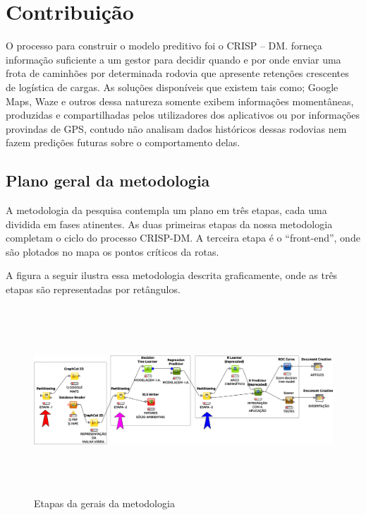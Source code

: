 \chapter{Contribuição}\label{meto}

O processo para construir o modelo preditivo foi o CRISP -- DM. forneça informação suficiente a um gestor para decidir quando e por onde 
enviar uma frota de caminhões por determinada rodovia que apresente retenções crescentes de logística de cargas. As soluções disponíveis que 
existem tais como; Google Maps, Waze e outros dessa natureza somente exibem informações momentâneas, produzidas e compartilhadas pelos utilizadores 
dos aplicativos ou por informações provindas de GPS, contudo não analisam dados históricos dessas rodovias nem fazem predições futuras sobre o 
comportamento delas. \\

\section{Plano geral da metodologia}

A metodologia da pesquisa contempla um plano em três etapas, cada uma dividida em fases atinentes.
As duas primeiras etapas da nossa metodologia completam o ciclo do processo CRISP-DM.
A terceira etapa é o ``front-end'', onde são plotados no mapa os pontos críticos da rotas.

\pagebreak

A figura a seguir ilustra essa metodologia descrita graficamente, onde as três etapas são representadas por retângulos.
 
\begin{figure}[ht]
\centering
\caption{Etapas da gerais da metodologia}
\includegraphics[width=160mm, height=70mm]{Figuras/BigData/Etapas.png}
\end{figure}

